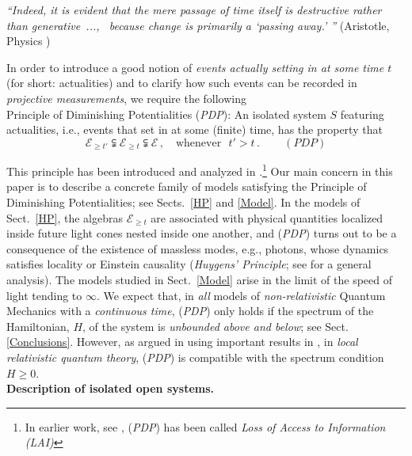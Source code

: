 \documentclass[12pt]{article}
\begin{document}
\hspace{0.5cm}\textit{``Indeed, it is evident that the mere passage of time itself is destructive rather than
\mbox{generative ..., } because change is primarily a `passing away.' ''}  (Aristotle, Physics )

In order to introduce a good notion of \textit{events actually setting in at some time $t$} (for short: actualities) and to clarify
how such events can be recorded in \textit{projective measurements}, we require the following \\

{Principle of Diminishing Potentialities} (\textit{PDP}): An isolated system $S$ featuring actualities, i.e., events that set in
at some (finite) time, has the property that
\begin{equation}\label{PDP}
 \mathcal{E}_{\geq t'} \subsetneqq \mathcal{E}_{\geq t} \subsetneqq \mathcal{E}\,, \quad \text{whenever}\,\,\,\, t'>t\,. \qquad\, (\textit{PDP})
\end{equation}

This principle has been introduced and analyzed in \cite{F-Schub, BFS, Fr1, Fr2}.\footnote{In earlier work, see \cite{BFS}, (\textit{PDP}) has
been called \textit{Loss of Access to Information (LAI)}}
Our main concern in this paper is to describe a concrete family of models satisfying the Principle of Diminishing Potentialities;
see Sects.~\ref{HP} and \ref{Model}. In the models of Sect.~\ref{HP}, the algebras $\mathcal{E}_{\geq t}$ are associated with
physical quantities localized inside future light cones nested inside one another, and (\textit{PDP}) turns out to be a
consequence of the existence of massless modes, e.g., photons, whose dynamics satisfies locality or Einstein
causality (\textit{Huygens' Principle}; see \cite{Buchholz} for a general analysis).
The models studied in Sect.~\ref{Model} arise in the limit of the speed of light tending to $\infty$. We expect that, in
\textit{all} models of \textit{non-relativistic} Quantum Mechanics with a \textit{continuous time}, (\textit{PDP}) only holds
if the spectrum of the Hamiltonian, $H$, of the system is \textit{unbounded above and below}; see Sect. \ref{Conclusions}.
However, as argued in \cite{Fr2} using important results in \cite{Buchholz}, in \textit{local relativistic quantum theory},
(\textit{PDP}) is compatible with the spectrum condition
$H\geq 0$.\\

{\bf{Description of isolated open systems.}}\\
\end{document}
